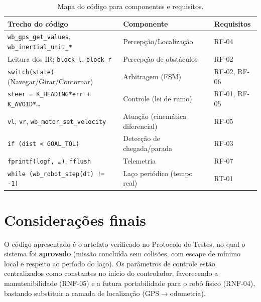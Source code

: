 \begin{table}[H]\centering
\caption{Mapa do código para componentes e requisitos.}
\label{tab:map}
\renewcommand{\arraystretch}{1.2}
\begin{tabularx}{\textwidth}{@{}X l l@{}}
\toprule
\textbf{Trecho do código} & \textbf{Componente} & \textbf{Requisitos} \\
\midrule
\texttt{wb\_gps\_get\_values}, \texttt{wb\_inertial\_unit\_*} & Percepção/Localização & RF-04 \\
Leitura dos IR; \texttt{block\_l}, \texttt{block\_r} & Percepção de obstáculos & RF-02 \\
\texttt{switch(state)} (Navegar/Girar/Contornar) & Arbitragem (FSM) & RF-02, RF-06 \\
\texttt{steer = K\_HEADING*err + K\_AVOID*\dots} & Controle (lei de rumo) & RF-01, RF-05 \\
\texttt{vl}, \texttt{vr}, \texttt{wb\_motor\_set\_velocity} & Atuação (cinemática diferencial) & RF-05 \\
\texttt{if (dist < GOAL\_TOL)} & Detecção de chegada/parada & RF-03 \\
\texttt{fprintf(logf, \dots)}, \texttt{fflush} & Telemetria & RF-07 \\
\texttt{while (wb\_robot\_step(dt) != -1)} & Laço periódico (tempo real) & RT-01 \\
\bottomrule
\end{tabularx}
\end{table}

\section{Considerações finais}
O código apresentado é o artefato verificado no Protocolo de Testes, no qual o sistema foi \textbf{aprovado} (missão concluída sem colisões, com escape de mínimo local e respeito ao período do laço). Os parâmetros de controle estão centralizados como constantes no início do controlador, favorecendo a manutenibilidade (RNF-05) e a futura portabilidade para o robô físico (RNF-04), bastando substituir a camada de localização (GPS$\to$odometria).


